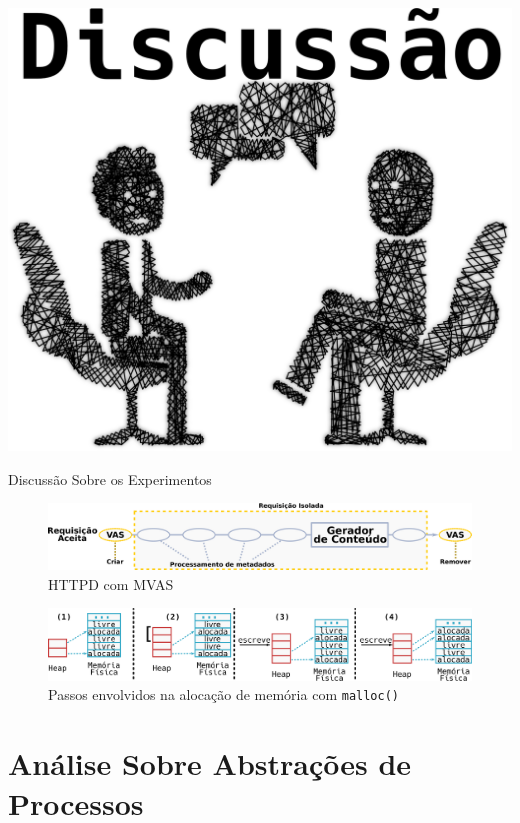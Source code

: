 \documentclass[xcolor={usenames,svgnames,dvipsnames},brazil,english,12pt,aspectratio=149]{beamer}
\begin{document}
\begin{frame}[plain]
  \centering
  \includegraphics[width=.7\textwidth]{discuss}
\end{frame}

\begin{frame}{Discussão Sobre os Experimentos}
  \begin{figure}[!h]
    \centering
    \includegraphics[width=\textwidth]{mvas_httpd}
    \caption*{HTTPD com MVAS}
  \end{figure}
  \begin{figure}[!h]
    \centering
    \includegraphics[width=\textwidth]{malloc}
    \caption*{Passos envolvidos na alocação de memória com \texttt{malloc()}}
  \end{figure}
\end{frame}

\section{Análise Sobre Abstrações de Processos}
\end{document}
